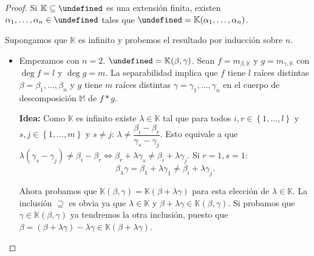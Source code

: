 \documentclass[10pt, spanish]{report}
\theoremstyle{definition}
\theoremstyle{custom}
\theoremstyle{remark}
\newcommand{\K}{\mathbb{K}}
\let\L\undefined
\newcommand{\L}{\mathbb{L}}
\begin{document}
\begin{proof}
    Si $\K\subseteq\L$ es una extensión finita, existen
    $\alpha_1,\ldots,\alpha_n\in\L$ tales que $\L=\K(\alpha_1,\ldots,\alpha_n)$.

    Supongamos que $\K$ es infinito y probemos el resultado por inducción sobre
    $n$.
    \begin{itemize}
        \item Empezamos con $n=2$. $\L=\K(\beta,\gamma)$. Sean
            $f=m_{\beta,\K}$ y $g=m_{\gamma,\K}$ con $\deg{f}=l$ y
            $\deg{g}=m$. La separabilidad implica que $f$ tiene $l$ raíces
            distintas $\beta=\beta_1,\ldots,\beta_n$ y $g$ tiene $m$ raíces
            distintas $\gamma=\gamma_1,\ldots,\gamma_n$ en el cuerpo de
            descomposición $\mathbb{M}$ de $f*g$.

            \textbf{Idea:} Como $\K$ es infinito existe $\lambda \in\K$ tal que
            para todos $i, r\in\left\{ 1,\ldots,l \right\} $ y $s,j\in\left\{
            1,\ldots,m \right\}$ y $s\neq j$: $\lambda \neq
            \dfrac{\beta_i-\beta_r}{\gamma_s-\gamma_j}$.  Esto equivale a que
            $\lambda(\gamma_s-\gamma_j)\neq \beta_i-\beta_r \Leftrightarrow
            \beta_r+\lambda\gamma_s\neq \beta_i+\lambda\gamma_j$.  Si $r=1,s=1$:
            \begin{equation}\tag{$\star$}\label{eq:lambdaprim}
                \beta_\lambda\gamma=\beta_1+\lambda\gamma_1\neq \beta_i+\lambda\gamma_j.
            \end{equation}

            Ahora probamos que $\K(\beta,\gamma)=\K(\beta+\lambda\gamma)$ para
            esta elección de $\lambda\in\K$. La inclusión $\supseteq$ es obvia
            ya que $\lambda\in\K$ y $\beta+\lambda\gamma\in\K(\beta,\gamma)$.
            Si probamos que $\gamma\in\K(\beta,\gamma)$ ya tendremos la otra
            inclusión, puesto que
            $\beta=(\beta+\lambda\gamma)-\lambda\gamma\in\K(\beta+\lambda\gamma)$.     


\end{itemize}
\end{proof}
\end{document}
